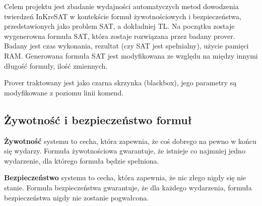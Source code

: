 \documentclass[a4paper,12pt]{article}
\begin{document}
Celem projektu jest zbadanie wydajności automatyczych metod dowodzenia twierdzeń InKreSAT w kontekście formuł żywotnościowych i bezpieczeństwa, przedstawionych jako problem \gls{SAT}, a dokładniej \gls{TL}. Na początku zostaje wygenerowna formuła \gls{SAT}, która zostaje rozwiązana przez badany prover. Badany jest czas wykonania, rezultat (czy \gls{SAT} jest spełnialny), użycie pamięci RAM.  Generowana formuła \gls{SAT} jest modyfikowana ze względu na między innymi długość formuły, ilość zmiennych.

Prover traktowany jest jako czarna skrzynka (blackbox), jego parametry są modyfikowane z poziomu linii komend.

\subsection{Żywotność i bezpieczeństwo formuł}

\textbf{Żywotność} systemu to cecha, która zapewnia, że coś dobrego na pewno w końcu się wydarzy. Formuła żywotnościowa gwarantuje, że istnieje co najmniej jedno wydarzenie, dla którego formuła będzie spełniona.

\textbf{Bezpieczeństwo} systemu to cecha, która zapewnia, że nic złego nigdy się nie stanie. Formuła bezpieczeństwa gwarantuje, że dla każdego wydarzenia, formuła bezpieczeństwa nigdy nie zostanie pogwałcona.
\end{document}
